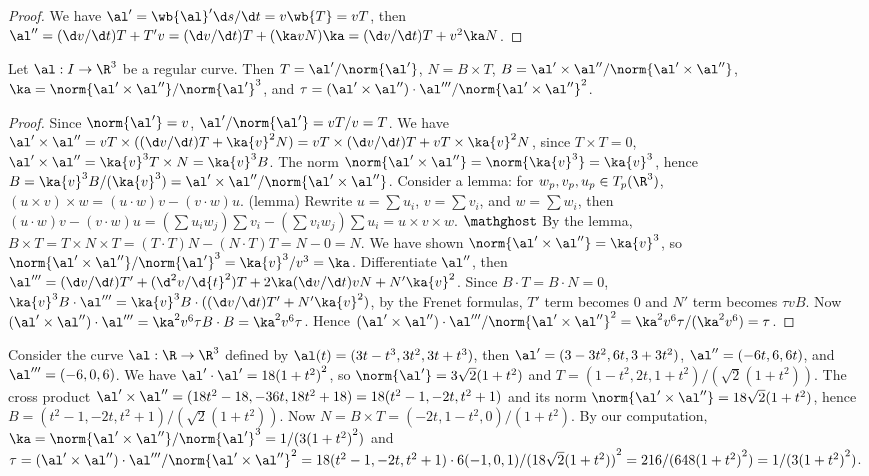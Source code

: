\documentclass[10pt]{article}
\begin{document}
\begin{proof}
    We have $\al'=\wb{\al}'\d s/\d t=v\wb{T}=vT$, then $\al''=(\d v/\d t)T+T'v=(\d v/\d t)T+(\ka vN)\ka=(\d v/\d t)T+{v}^{2}\ka N$.
\end{proof}
\begin{proposition}
    Let $\al:I\to{\R}^{3}$ be a regular curve. Then $T=\al'/\norm{\al'}$, $N=B\times T$, $B=\al'\times\al''/\norm{\al'\times\al''}$, $\ka=\norm{\al'\times\al''}/{\norm{\al'}}^{3}$, and $\tau=(\al'\times\al'')\cdot\al'''/{\norm{\al'\times\al''}}^{2}$.
\end{proposition}
\begin{proof}
    Since $\norm{\al'}=v$, $\al'/\norm{\al'}=vT/v=T$. We have $\al'\times\al''=vT\times((\d v/\d t)T+\ka{v}^{2}N)=vT\times(\d v/\d t)T+vT\times\ka{v}^{2}N$, since $T\times T=0$, $\al'\times\al''=\ka{v}^{3}T\times N=\ka{v}^{3}B$. The norm $\norm{\al'\times\al''}=\norm{\ka{v}^{3}}=\ka{v}^{3}$, hence $B=\ka{v}^{3}B/(\ka{v}^{3})=\al'\times\al''/\norm{\al'\times\al''}$. Consider a lemma: for ${w}_{p},{v}_{p},{u}_{p}\in{T}_{p}({\R}^{3})$, $(u\times v)\times w=(u\cdot w)v-(v\cdot w)u$. (lemma) Rewrite $u=\sum{u}_{i}$, $v=\sum{v}_{i}$, and $w=\sum{w}_{i}$, then $(u\cdot w)v-(v\cdot w)u=(\sum{u}_{i}{w}_{j})\sum{v}_{i}-(\sum{v}_{i}{w}_{j})\sum{u}_{i}=u\times v\times w$. $\mathghost$ By the lemma, $B\times T=T\times N\times T=(T\cdot T)N-(N\cdot T)T=N-0=N$. We have shown $\norm{\al'\times\al''}=\ka{v}^{3}$, so $\norm{\al'\times\al''}/{\norm{\al'}}^{3}=\ka{v}^{3}/{v}^{3}=\ka$. Differentiate $\al''$, then $\al'''=(\d v/\d t)T'+({\d}^{2}v/\d{t}^{2})T+2\ka(\d v/\d t)vN+N'\ka{v}^{2}$. Since $B\cdot T=B\cdot N=0$, $\ka{v}^{3}B\cdot\al'''=\ka{v}^{3}B\cdot((\d v/\d t)T'+N'\ka{v}^{2})$, by the Frenet formulas, $T'$ term becomes 0 and $N'$ term becomes $\tau vB$. Now $(\al'\times\al'')\cdot\al'''={\ka}^{2}{v}^{6}\tau B\cdot B={\ka}^{2}{v}^{6}\tau$. Hence $(\al'\times\al'')\cdot\al'''/{\norm{\al'\times\al''}}^{2}={\ka}^{2}{v}^{6}\tau/({\ka}^{2}{v}^{6})=\tau$.
\end{proof}
\begin{example}
    Consider the curve $\al:\R\to{\R}^{3}$ defined by $\al(t)=(3t-{t}^{3},3{t}^{2},3t+{t}^{3})$, then $\al'=(3-3{t}^{2},6t,3+3{t}^{2})$, $\al''=(-6t,6,6t)$, and $\al'''=(-6,0,6)$. We have $\al'\cdot\al'=18{(1+{t}^{2})}^{2}$, so $\norm{\al'}=3\sqrt{2}(1+{t}^{2})$ and $T=(1-{t}^{2},2t,1+{t}^{2})/(\sqrt{2}(1+{t}^{2}))$. The cross product $\al'\times\al''=(18{t}^{2}-18,-36t,18{t}^{2}+18)=18({t}^{2}-1,-2t,{t}^{2}+1)$ and its norm $\norm{\al'\times\al''}=18\sqrt{2}(1+{t}^{2})$, hence $B=({t}^{2}-1,-2t,{t}^{2}+1)/(\sqrt{2}(1+{t}^{2}))$. Now $N=B\times T=(-2t,1-{t}^{2},0)/(1+{t}^{2})$. By our computation, $\ka=\norm{\al'\times\al''}/{\norm{\al'}}^{3}=1/(3{(1+{t}^{2})}^{2})$ and $\tau=(\al'\times\al'')\cdot\al'''/{\norm{\al'\times\al''}}^{2}=18({t}^{2}-1,-2t,{t}^{2}+1)\cdot 6(-1,0,1)/{(18\sqrt{2}(1+{t}^{2}))}^{2}=216/(648{(1+{t}^{2})}^{2})=1/(3{(1+{t}^{2})}^{2})$.
\end{example}
\end{document}
